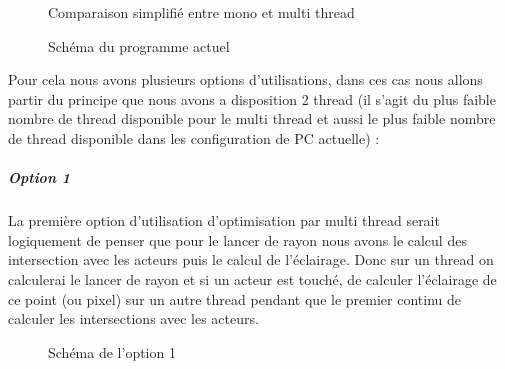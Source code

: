 \documentclass[12pt]{article}
\begin{document}
				\begin{figure}[!hbtp]
  					\caption{Comparaison simplifié entre mono et multi thread}
  					\label{fig:multithread}
				\end{figure}
			
				\begin{figure}[!hbtp]
  					\caption{Schéma du programme actuel}
  					\label{fig:currentschematic}
				\end{figure}		
			
				Pour cela nous avons plusieurs options d'utilisations, dans ces cas nous allons partir du principe que nous avons a disposition 2 thread (il s'agit du plus faible nombre de thread disponible pour le multi thread et aussi le plus faible nombre de thread disponible dans les configuration de PC actuelle) :
			
					\subparagraph{Option 1}
					La première option d'utilisation d'optimisation par multi thread serait logiquement de penser que pour le lancer de rayon nous avons le calcul des intersection avec les acteurs puis le calcul de l'éclairage. Donc sur un thread on calculerai le lancer de rayon et si un acteur est touché, de calculer l'éclairage de ce point (ou pixel) sur un autre thread pendant que le premier continu de calculer les intersections avec les acteurs.
					\begin{figure}[!hbtp]
  						\caption{Schéma de l'option 1}
  						\label{fig:option1}
					\end{figure}
			
\end{document}
